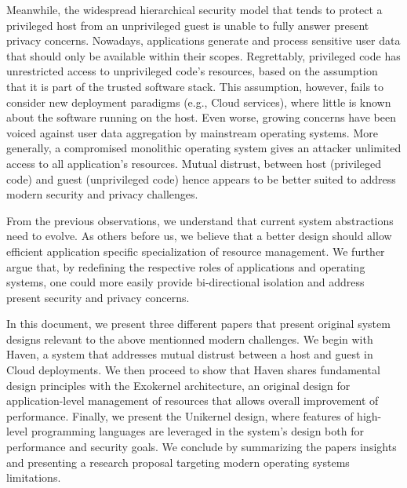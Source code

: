 Meanwhile, the widespread hierarchical security model that tends to protect a privileged host from an unprivileged guest is unable to fully answer present privacy concerns.
Nowadays, applications generate and process sensitive user data that should only be available within their scopes.
Regrettably, privileged code has unrestricted access to unprivileged code's resources, based on the assumption that it is part of the trusted software stack.
This assumption, however, fails to consider new deployment paradigms (e.g., Cloud services), where little is known about the software running on the host.
Even worse, growing concerns have been voiced against user data aggregation by mainstream operating systems\cite{microsoftspy}.
More generally, a compromised monolithic operating system gives an attacker unlimited access to all application's resources.
Mutual distrust, between host (privileged code) and guest (unprivileged code) hence appears to be better suited to address modern security and privacy challenges.

From the previous observations, we understand that current system abstractions need to evolve.
As others before us\cite{DBLP:conf/sosp/EnglerKO95,DBLP:conf/hotos/EnglerK95,DBLP:conf/sosp/KaashoekEGBHMPGM97,DBLP:journals/tocs/CaoFKL96,DBLP:journals/sigops/HartyC92}, we believe that a better design should allow efficient application specific specialization of resource management.
We further argue that, by redefining the respective roles of applications and operating systems, one could more easily provide bi-directional isolation and address present security and privacy concerns.

In this document, we present three different papers that present original system designs relevant to the above mentionned modern challenges.
We begin with Haven\cite{DBLP:journals/tocs/BaumannPH15}, a system that addresses mutual distrust between a host and guest in Cloud deployments.
We then proceed to show that Haven shares fundamental design principles with the Exokernel architecture\cite{DBLP:conf/sosp/EnglerKO95}, an original design for application-level management of resources that allows overall improvement of performance.
Finally, we present the Unikernel\cite{DBLP:conf/asplos/MadhavapeddyMRSSGSHC13} design, where features of high-level programming languages are leveraged in the system's design both for performance and security goals.
We conclude by summarizing the papers insights and presenting a research proposal targeting modern operating systems limitations.